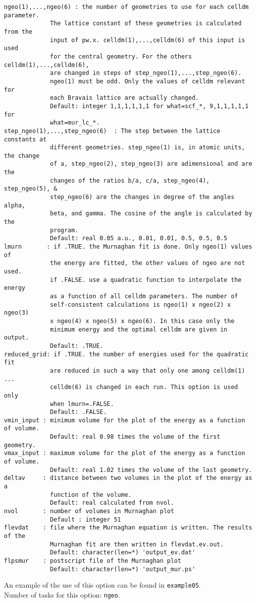 \documentclass[12pt,a4paper]{article}
\begin{document}
\begin{verbatim}
ngeo(1),...,ngeo(6) : the number of geometries to use for each celldm parameter.
             The lattice constant of these geometries is calculated from the
             input of pw.x. celldm(1),...,celldm(6) of this input is used 
             for the central geometry. For the others celldm(1),...,celldm(6),
             are changed in steps of step_ngeo(1),...,step_ngeo(6). 
             ngeo(1) must be odd. Only the values of celldm relevant for
             each Bravais lattice are actually changed.
             Default: integer 1,1,1,1,1,1 for what=scf_*, 9,1,1,1,1,1 for 
             what=mur_lc_*.
step_ngeo(1),...,step_ngeo(6)  : The step between the lattice constants at 
             different geometries. step_ngeo(1) is, in atomic units, the change
             of a, step_ngeo(2), step_ngeo(3) are adimensional and are the
             changes of the ratios b/a, c/a, step_ngeo(4), step_ngeo(5), &
             step_ngeo(6) are the changes in degree of the angles alpha,
             beta, and gamma. The cosine of the angle is calculated by the
             program.
             Default: real 0.05 a.u., 0.01, 0.01, 0.5, 0.5, 0.5
lmurn       : if .TRUE. the Murnaghan fit is done. Only ngeo(1) values of
             the energy are fitted, the other values of ngeo are not used. 
             if .FALSE. use a quadratic function to interpolate the energy 
             as a function of all celldm parameters. The number of 
             self-consistent calculations is ngeo(1) x ngeo(2) x ngeo(3)
             x ngeo(4) x ngeo(5) x ngeo(6). In this case only the 
             minimum energy and the optimal celldm are given in output. 
             Default: .TRUE. 
reduced_grid: if .TRUE. the number of energies used for the quadratic fit 
             are reduced in such a way that only one among celldm(1) ... 
             celldm(6) is changed in each run. This option is used only 
             when lmurn=.FALSE.
             Default: .FALSE.
vmin_input : minimum volume for the plot of the energy as a function of volume.
             Default: real 0.98 times the volume of the first geometry.
vmax_input : maximum volume for the plot of the energy as a function of volume.
             Default: real 1.02 times the volume of the last geometry.
deltav     : distance between two volumes in the plot of the energy as a 
             function of the volume.
             Default: real calculated from nvol.
nvol       : number of volumes in Murnaghan plot
             Default : integer 51
flevdat    : file where the Murnaghan equation is written. The results of the
             Murnaghan fit are then written in flevdat.ev.out.
             Default: character(len=*) 'output_ev.dat'
flpsmur    : postscript file of the Murnaghan plot
             Default: character(len=*) 'output_mur.ps'
\end{verbatim}
An example of the use of this option can be found in \texttt{example05}.\\
Number of tasks for this option: \texttt{ngeo}.
\end{document}
